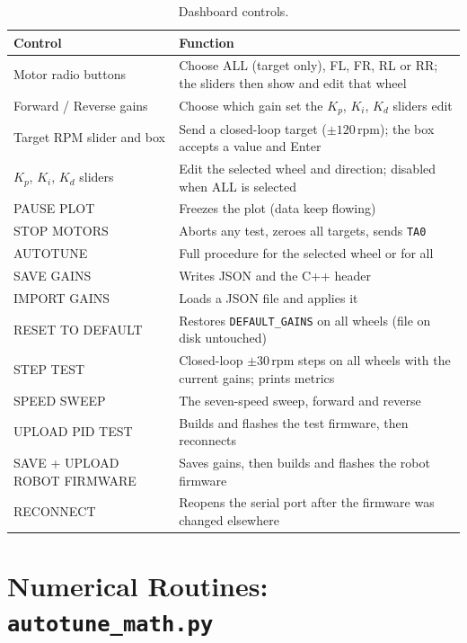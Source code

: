 \documentclass[11pt,a4paper]{report}
\newcommand{\code}[1]{\texttt{#1}}
\begin{document}
\begin{table}[H]
\centering
\caption{Dashboard controls.}\label{tab:buttons}
\small
\begin{tabular}{@{}lp{9.5cm}@{}}
\toprule
Control & Function\\
\midrule
Motor radio buttons & Choose ALL (target only), FL, FR, RL or RR; the sliders then show and edit that wheel\\
Forward / Reverse gains & Choose which gain set the $K_p$, $K_i$, $K_d$ sliders edit\\
Target RPM slider and box & Send a closed-loop target ($\pm120$\,rpm); the box accepts a value and Enter\\
$K_p$, $K_i$, $K_d$ sliders & Edit the selected wheel and direction; disabled when ALL is selected\\
PAUSE PLOT & Freezes the plot (data keep flowing)\\
STOP MOTORS & Aborts any test, zeroes all targets, sends \code{TA0}\\
AUTOTUNE & Full procedure for the selected wheel or for all\\
SAVE GAINS & Writes JSON and the C++ header\\
IMPORT GAINS & Loads a JSON file and applies it\\
RESET TO DEFAULT & Restores \code{DEFAULT\_GAINS} on all wheels (file on disk untouched)\\
STEP TEST & Closed-loop $\pm30$\,rpm steps on all wheels with the current gains; prints metrics\\
SPEED SWEEP & The seven-speed sweep, forward and reverse\\
UPLOAD PID TEST & Builds and flashes the test firmware, then reconnects\\
SAVE + UPLOAD ROBOT FIRMWARE & Saves gains, then builds and flashes the robot firmware\\
RECONNECT & Reopens the serial port after the firmware was changed elsewhere\\
\bottomrule
\end{tabular}
\end{table}

\chapter[Numerical Routines]{Numerical Routines: \texttt{autotune\_math.py}}\label{ch:math}
\end{document}
